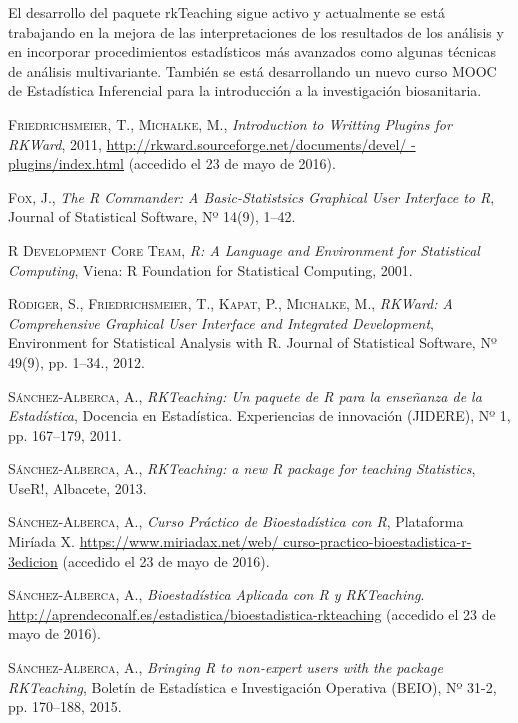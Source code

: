 \documentclass[a4paper,10pt,twoside]{article}
\newcommand{\rkteaching}{\textsf{rkTeaching}}
\begin{document}
El desarrollo del paquete \rkteaching{} sigue activo y actualmente se está trabajando en la mejora de las interpretaciones
de los resultados de los análisis y en incorporar procedimientos estadísticos más avanzados como algunas técnicas de
análisis multivariante. 
También se está desarrollando un nuevo curso MOOC de Estadística Inferencial para la introducción a la investigación
biosanitaria. 

\begin{thebibliography}{9}

\textsc{Friedrichsmeier}, T., \textsc{Michalke}, M., \textit{Introduction to Writting Plugins
for RKWard}, 2011, \url{http://rkward.sourceforge.net/documents/devel/
-plugins/index.html} (accedido el 23 de mayo de 2016).

\textsc{Fox}, J., \textit{The R Commander: A Basic-Statistsics Graphical User Interface to R}, Journal
of Statistical Software, Nº 14(9), 1--42.

\textsc{R Development Core Team}, \textit{R: A Language and Environment for Statistical Computing}, Viena: R Foundation
for Statistical Computing, 2001. 

\textsc{Rödiger}, S., \textsc{Friedrichsmeier}, T., \textsc{Kapat}, P., \textsc{Michalke}, M., \textit{RKWard: A
Comprehensive Graphical User Interface and Integrated Development}, Environment for Statistical Analysis
with R. Journal of Statistical Software, Nº 49(9), pp. 1--34., 2012.

\textsc{Sánchez-Alberca}, A., \textit{RKTeaching: Un paquete de R para la enseñanza de la Estadística}, Docencia en
Estadística. Experiencias de innovación (JIDERE), Nº 1, pp. 167--179, 2011.

\textsc{Sánchez-Alberca}, A., \textit{RKTeaching: a new R package for teaching Statistics}, UseR!, Albacete, 2013. 

\textsc{Sánchez-Alberca}, A., \textit{Curso Práctico de Bioestadística con R}, Plataforma Miríada X.
\url{https://www.miriadax.net/web/ curso-practico-bioestadistica-r-3edicion} (accedido el 23 de mayo de 2016).

\textsc{Sánchez-Alberca}, A., \textit{Bioestadística Aplicada con R y RKTeaching}.
\url{http://aprendeconalf.es/estadistica/bioestadistica-rkteaching} (accedido el 23 de mayo de 2016).

\textsc{Sánchez-Alberca}, A., \textit{Bringing R to non-expert users with the package RKTeaching}, Boletín de
Estadística e Investigación Operativa (BEIO), Nº 31-2, pp. 170--188, 2015.

\end{thebibliography}
\end{document}
